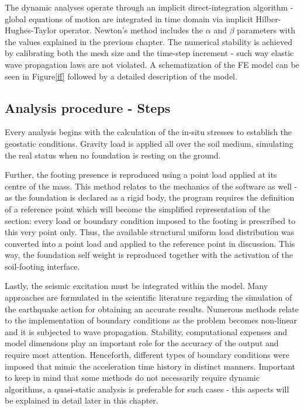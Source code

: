 The dynamic analyses operate through an implicit direct-integration algorithm - global equations of motion are integrated in time domain via implicit Hilber-Hughes-Taylor operator. Newton's method includes the $\alpha$ and $\beta$ parameters with the values explained in the previous chapter. The numerical stability is achieved by calibrating both the mesh size and the time-step increment - such way elastic wave propagation laws are not violated. A schematization of the FE model can be seen in Figure\ref{ff} followed by a detailed description of the model.

\subsection{Analysis procedure - Steps}
Every analysis begins with the calculation of the in-situ stresses to establish the geostatic conditions. Gravity load is applied all over the soil medium, simulating the real status when no foundation is resting on the ground. 

Further, the footing presence is reproduced using a point load applied at its centre of the mass. This method relates to the mechanics of the software as well - as the foundation is declared as a rigid body, the program requires the definition of a reference point which will become the simplified representation of the section: every load or boundary condition imposed to the footing is prescribed to this very point only. Thus, the available structural uniform load distribution was converted into a point load and applied to the reference point in discussion. This way, the foundation self weight is reproduced together with the activation of the soil-footing interface. 

Lastly, the seismic excitation must be integrated within the model. Many approaches are formulated in the scientific literature regarding the simulation of the earthquake action for obtaining an accurate results. Numerous methods relate to the implementation of boundary conditions as the problem becomes non-linear and it is subjected to wave propagation. Stability, computational expenses and model dimensions play an important role for the accuracy of the output and require most attention.  Henceforth, different types of boundary conditions were imposed that mimic the acceleration time history in distinct manners. Important to keep in mind that some methods do not necessarily require dynamic algorithms, a quasi-static analysis is preferable for such cases - this aspects will be explained in detail later in this chapter.

